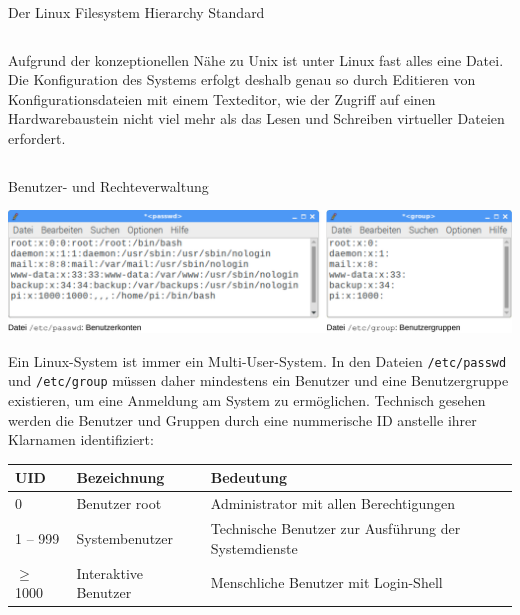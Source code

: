 {\begin{frame}[allowframebreaks]{Der Linux Filesystem Hierarchy Standard}
\begin{columns}[T]
        \parbox{\linewidth}{
            Aufgrund der konzeptionellen Nähe zu Unix ist unter Linux fast alles
            eine Datei. Die Konfiguration des Systems erfolgt deshalb genau so
            durch Editieren von Konfigurationsdateien mit einem Texteditor, wie
            der Zugriff auf einen Hardwarebaustein nicht viel mehr als das Lesen
            und Schreiben virtueller Dateien erfordert.
        }
    \end{columns}
\end{frame}
}

{
\footnotesize
\setlength{\leftmargini}{1.2em}

\begin{frame}[allowframebreaks]{Benutzer- und Rechteverwaltung}
    \begin{center}
        \includegraphics[width=\textwidth]{8-linux/img/rechte-konfiguration}
    \end{center}

    \parbox{\linewidth}{
        Ein Linux-System ist immer ein Multi-User-System. In den Dateien
        \texttt{/etc/passwd} und \texttt{/etc/group} müssen daher mindestens ein
        Benutzer und eine Benutzergruppe existieren, um eine Anmeldung am System
        zu ermöglichen. Technisch gesehen werden die Benutzer und Gruppen durch
        eine nummerische ID anstelle ihrer Klarnamen identifiziert:
    }

    \medskip

    \begin{tabularx}{\textwidth}{|p{}|p{}|X|}
        \hline
        \textbf{UID} & \textbf{Bezeichnung} & \textbf{Bedeutung} \\
        \hline

        0 & Benutzer root & Administrator mit allen Berechtigungen \\
        \hline

        1 -- 999 & Systembenutzer & Technische Benutzer zur Ausführung der Systemdienste \\
        \hline

        $\geq$ 1000 & Interaktive Benutzer & Menschliche Benutzer mit Login-Shell \\
        \hline
    \end{tabularx}


\end{frame}}
